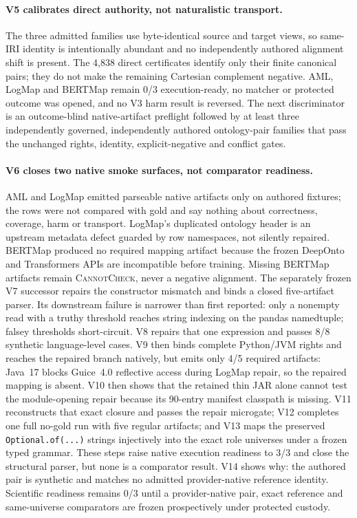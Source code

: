 \paragraph{V5 calibrates direct authority, not naturalistic transport.}
The three admitted families use byte-identical source and target views, so
same-IRI identity is intentionally abundant and no independently authored
alignment shift is present. The 4,838 direct certificates identify only their
finite canonical pairs; they do not make the remaining Cartesian complement
negative. AML, LogMap and BERTMap remain 0/3 execution-ready, no matcher or
protected outcome was opened, and no V3 harm result is reversed. The next
discriminator is an outcome-blind native-artifact preflight followed by at
least three independently governed, independently authored ontology-pair
families that pass the unchanged rights, identity, explicit-negative and
conflict gates.

\paragraph{V6 closes two native smoke surfaces, not comparator readiness.}
AML and LogMap emitted parseable native artifacts only on authored fixtures;
the rows were not compared with gold and say nothing about correctness,
coverage, harm or transport. LogMap's duplicated ontology header is an
upstream metadata defect guarded by row namespaces, not silently repaired.
BERTMap produced no required mapping artifact because the frozen DeepOnto and
Transformers APIs are incompatible before training. Missing BERTMap artifacts
remain \textsc{CannotCheck}, never a negative alignment. The separately frozen
V7 successor repairs the constructor mismatch and binds a closed five-artifact
parser. Its downstream failure is narrower than first reported: only a
nonempty read with a truthy threshold reaches string indexing on the pandas
namedtuple; falsey thresholds short-circuit. V8 repairs that one expression and
passes 8/8 synthetic language-level cases. V9 then binds complete Python/JVM
rights and reaches the repaired branch natively, but emits only 4/5 required
artifacts: Java~17 blocks Guice~4.0 reflective access during LogMap repair, so
the repaired mapping is absent. V10 then shows that the retained thin JAR alone
cannot test the module-opening repair because its 90-entry manifest classpath is
missing. V11 reconstructs that exact closure and passes the repair microgate;
V12 completes one full no-gold run with five regular artifacts; and V13 maps
the preserved \texttt{Optional.of(...)} strings injectively into the exact role
universes under a frozen typed grammar. These steps raise native execution
readiness to 3/3 and close the structural parser, but none is a comparator
result. V14 shows why: the authored pair is synthetic and matches no admitted
provider-native reference identity. Scientific readiness remains 0/3 until a
provider-native pair, exact reference and same-universe comparators are frozen
prospectively under protected custody.

